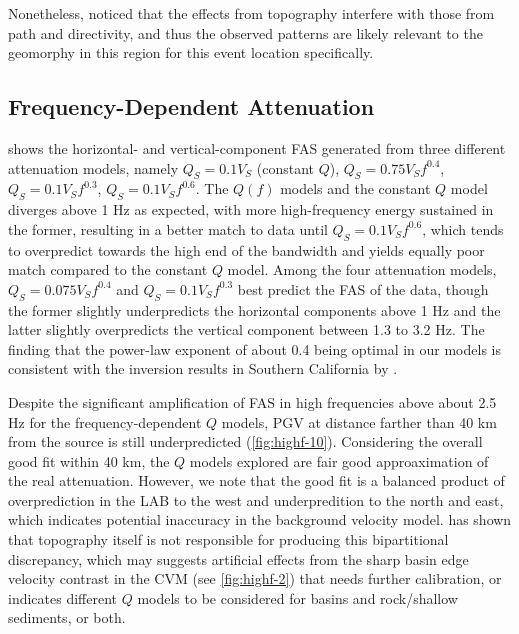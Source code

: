 Nonetheless, \citet{leeEffectsRealisticSurface2009} noticed that the effects from topography interfere with those from path and directivity, and thus the observed patterns are likely relevant to the geomorphy in this region for this event location specifically.


\subsection{Frequency-Dependent Attenuation}
 shows the horizontal- and vertical-component FAS generated from three different attenuation models, namely $Q_S=0.1V_S$ (constant $Q$), $Q_S=0.75V_Sf^{0.4}$, $Q_S=0.1V_Sf^{0.3}$, $Q_S=0.1V_Sf^{0.6}$. The $Q(f)$ models and the constant $Q$ model diverges above 1 Hz as expected, with more high-frequency energy sustained in the former, resulting in a better match to data until $Q_S=0.1V_Sf^{0.6}$, which tends to overpredict towards the high end of the bandwidth and yields equally poor match compared to the constant $Q$ model. Among the four attenuation models, $Q_S=0.075V_Sf^{0.4}$ and $Q_S=0.1V_Sf^{0.3}$ best predict the FAS of the data, though the former slightly underpredicts the horizontal components above 1 Hz and the latter slightly overpredicts the vertical component between 1.3 to 3.2 Hz. The finding that the power-law exponent of about 0.4 being optimal in our models is consistent with the inversion results in Southern California by \citet{linFrequencyDependentAttenuationWaves2018}.


Despite the significant amplification of FAS in high frequencies above about 2.5 Hz for the frequency-dependent $Q$ models, PGV at distance farther than 40 km from the source is still underpredicted (\cref{fig:highf-10}). Considering the overall good fit within 40 km, the $Q$ models explored are fair good approaximation of the real attenuation. However, we note that the good fit is a balanced product of overprediction in the LAB to the west and underpredition to the north and east, which indicates potential inaccuracy in the background velocity model.  has shown that topography itself is not responsible for producing this bipartitional discrepancy, which may suggests artificial effects from the sharp basin edge velocity contrast in the CVM (see \cref{fig:highf-2}) that needs further calibration, or indicates different $Q$ models to be considered for basins and rock/shallow sediments, or both.

